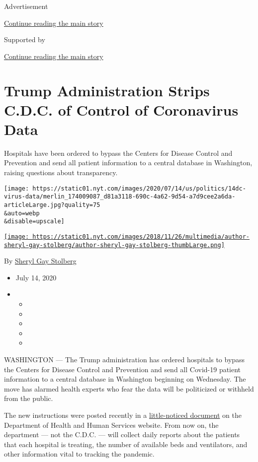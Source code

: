 Advertisement

\protect\hyperlink{after-top}{Continue reading the main story}

Supported by

\protect\hyperlink{after-sponsor}{Continue reading the main story}

\hypertarget{trump-administration-strips-cdc-of-control-of-coronavirus-data}{%
\section{Trump Administration Strips C.D.C. of Control of Coronavirus
Data}\label{trump-administration-strips-cdc-of-control-of-coronavirus-data}}

Hospitals have been ordered to bypass the Centers for Disease Control
and Prevention and send all patient information to a central database in
Washington, raising questions about transparency.

\texttt{[image: https://static01.nyt.com/images/2020/07/14/us/politics/14dc-virus-data/merlin\_174009087\_d81a3118-690c-4a62-9d54-a7d9cee2a6da-articleLarge.jpg?quality=75\\\&auto=webp\\\&disable=upscale]}

\href{https://www.nytimes.com/by/sheryl-gay-stolberg}{\texttt{[image: https://static01.nyt.com/images/2018/11/26/multimedia/author-sheryl-gay-stolberg/author-sheryl-gay-stolberg-thumbLarge.png]}}

By \href{https://www.nytimes.com/by/sheryl-gay-stolberg}{Sheryl Gay
Stolberg}

\begin{itemize}
\item
  July 14, 2020
\item
  \begin{itemize}
  \item
  \item
  \item
  \item
  \item
  \end{itemize}
\end{itemize}

WASHINGTON --- The Trump administration has ordered hospitals to bypass
the Centers for Disease Control and Prevention and send all Covid-19
patient information to a central database in Washington beginning on
Wednesday. The move has alarmed health experts who fear the data will be
politicized or withheld from the public.

The new instructions were posted recently in a
\href{https://www.hhs.gov/sites/default/files/covid-19-faqs-hospitals-hospital-laboratory-acute-care-facility-data-reporting.pdf}{little-noticed
document} on the Department of Health and Human Services website. From
now on, the department --- not the C.D.C. --- will collect daily reports
about the patients that each hospital is treating, the number of
available beds and ventilators, and other information vital to tracking
the pandemic.

